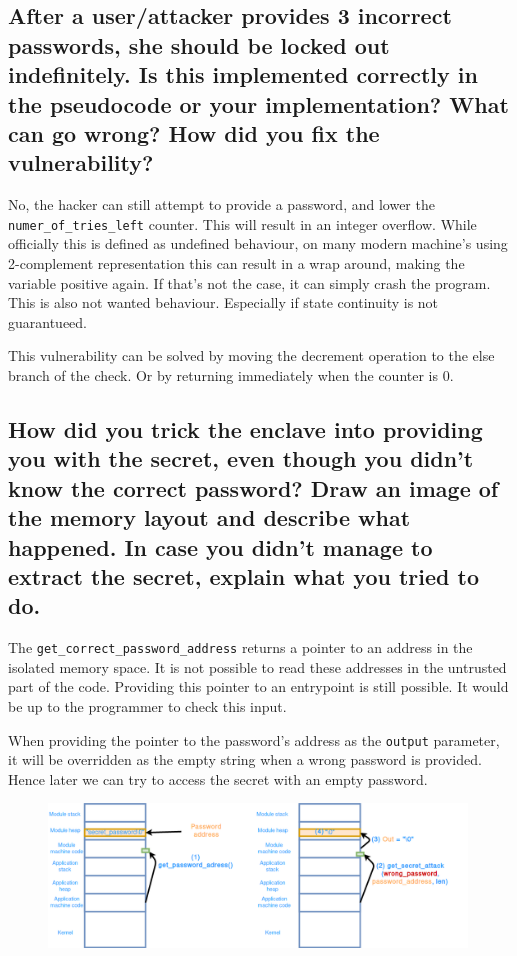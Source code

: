 \documentclass{article}
\begin{document}
\subsection{After a user/attacker provides 3 incorrect passwords, she should be locked
  out indefinitely.  Is this implemented correctly in the pseudocode or your
implementation?  What can go wrong?  How did you fix the vulnerability?}

No, the hacker can still attempt to provide a password, and lower the
\texttt{numer\_of\_tries\_left} counter. This will result in an integer
overflow. While officially this is defined as undefined behaviour, on many
modern machine's using 2-complement representation this can result in a wrap
around, making the variable positive again. If that's not the case, it can simply
crash the program. This is also not wanted behaviour. Especially if state
continuity is not guarantueed.

This vulnerability can be solved by moving the decrement operation to the else
branch of the check. Or by returning immediately when the counter is 0.

\subsection{How did you trick the enclave into providing you with the secret, even
  though you didn’t know the correct password?   Draw an image of the
  memory layout and describe what happened.  In case you didn’t manage
to extract the secret, explain what you tried to do.}

The \texttt{get\_correct\_password\_address} returns a pointer to an address in
the isolated memory space. It is not possible to read these addresses
in the untrusted part of the code. Providing this pointer to an entrypoint is
still possible. It would be up to the programmer to check this input. 

When providing the pointer to the password's address as the \texttt{output}
parameter, it will be overridden as the empty string when a wrong password is
provided. Hence later we can try to access the secret with an empty password.

  \begin{figure}
    \includegraphics[width=0.99\textwidth]{./sgx.png}
  \end{figure}
\end{document}
